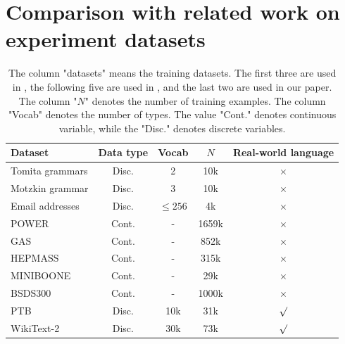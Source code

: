 \section{Comparison with related work on experiment datasets}
\label{sec:datasets}
\begin{table}[t]
    \centering
    \begin{tabular}{l|c|c|c|c}
    \toprule
        Dataset & Data type & Vocab  & $N$ & Real-world language  \\
         \midrule
        Tomita grammars  \cite{tomita1982dynamic}  & Disc. & 2  & 10k & $\times$ \\ 
        Motzkin grammar \citep{alexander2021exact} & Disc. & 3 & 10k   &$\times$ \\
         Email addresses \citep{radev2008clair} & Disc. & $\leq 256$ & 4k & $\times$  \\
        \midrule
        POWER  \cite{Dua:2019} & Cont. & - & 1659k & $\times$ \\
        GAS \cite{fonollosa2015reservoir} & Cont. & - & 852k &  $\times$ \\
        HEPMASS \cite{baldi2016parameterized} & Cont. & - & 315k & $\times$  \\
        MINIBOONE \cite{roe2005boosted} & Cont. & -  & 29k & $\times$  \\
        BSDS300 \citep{martin2001database}  & Cont. & - & 1000k &  $\times$ \\
         
        \midrule
        PTB \citep{marcinkiewicz1994building} & Disc. & 10k  & 31k & $\surd$ \\
        WikiText-2  \citep{merity2016pointer} & Disc. & 30k & 73k &  $\surd$ \\  
        
 \bottomrule
    \end{tabular}
    \caption{The column "datasets" means the training datasets. The first three are used in  \citep{miller2021tensor}, the following five are used in  \cite{novikov2021tensor}, and the last two are used in our paper.  The column "$N$" denotes the number of training examples. The column "Vocab" denotes the number of types. The value "Cont." denotes continuous variable, while the "Disc." denotes  discrete variables. }
    \label{tab:datasets}
\end{table}






